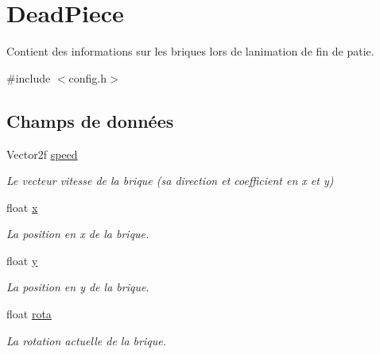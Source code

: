 \hypertarget{structDeadPiece}{}\section{Dead\+Piece}
\label{structDeadPiece}


Contient des informations sur les briques lors de l\textquotesingle{}animation de fin de patie.  




{\ttfamily \#include $<$config.\+h$>$}

\subsection*{Champs de données}
\begin{DoxyCompactItemize}
\item 
\mbox{\label{structDeadPiece_a0ddf4b0a5ed5722a01921ac93280c127}} 
Vector2f \hyperlink{structDeadPiece_a0ddf4b0a5ed5722a01921ac93280c127}{speed}
\begin{DoxyCompactList}\small\item\em Le vecteur vitesse de la brique (sa direction et coefficient en x et y) \end{DoxyCompactList}\item 
\mbox{\label{structDeadPiece_ad0da36b2558901e21e7a30f6c227a45e}} 
float \hyperlink{structDeadPiece_ad0da36b2558901e21e7a30f6c227a45e}{x}
\begin{DoxyCompactList}\small\item\em La position en x de la brique. \end{DoxyCompactList}\item 
\mbox{\label{structDeadPiece_aa4f0d3eebc3c443f9be81bf48561a217}} 
float \hyperlink{structDeadPiece_aa4f0d3eebc3c443f9be81bf48561a217}{y}
\begin{DoxyCompactList}\small\item\em La position en y de la brique. \end{DoxyCompactList}\item 
\mbox{\label{structDeadPiece_ae43da48273bcb8c956b52f685d68aea9}} 
float \hyperlink{structDeadPiece_ae43da48273bcb8c956b52f685d68aea9}{rota}
\begin{DoxyCompactList}\small\item\em La rotation actuelle de la brique. \end{DoxyCompactList}\item 

\end{DoxyCompactItemize}
